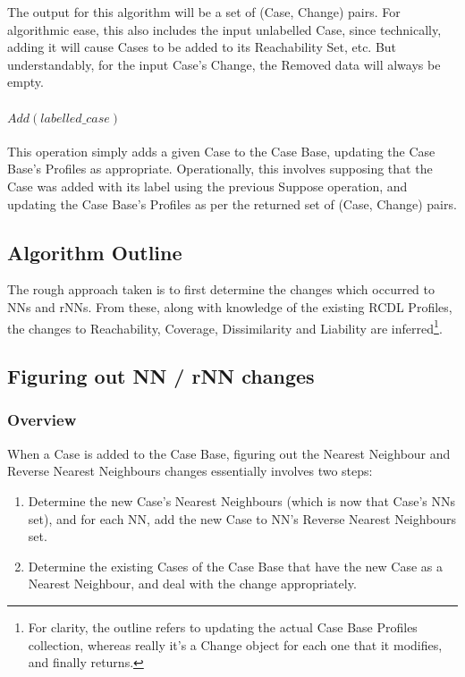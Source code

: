 \documentclass[a4paper,11pt]{report}
\begin{document}
The output for this algorithm will be a set of (Case, Change) pairs. For algorithmic ease, this also includes the input unlabelled Case, since technically, adding it will cause Cases to be added to its Reachability Set, etc. But understandably, for the input Case's Change, the Removed data will always be empty.

\paragraph{$Add(labelled\_case)$}
This operation simply adds a given Case to the Case Base, updating the Case Base's Profiles as appropriate. Operationally, this involves supposing that the Case was added with its label using the previous Suppose operation, and updating the Case Base's Profiles as per the returned set of (Case, Change) pairs.

\subsection{Algorithm Outline}
The rough approach taken is to first determine the changes which occurred to NNs and rNNs. From these, along with knowledge of the existing RCDL Profiles, the changes to Reachability, Coverage, Dissimilarity and Liability are inferred\footnote{For clarity, the outline refers to updating the actual Case Base Profiles collection, whereas really it's a Change object for each one that it modifies, and finally returns.}.

\subsection{Figuring out NN / rNN changes}
\subsubsection{Overview}
When a Case is added to the Case Base, figuring out the Nearest Neighbour and Reverse Nearest Neighbours changes essentially involves two steps:
\begin{enumerate}
	\item Determine the new Case's Nearest Neighbours (which is now that Case's NNs set), and for each NN, add the new Case to NN's Reverse Nearest Neighbours set.
	\item Determine the existing Cases of the Case Base that have the new Case as a Nearest Neighbour, and deal with the change appropriately.
\end{enumerate}
\end{document}
